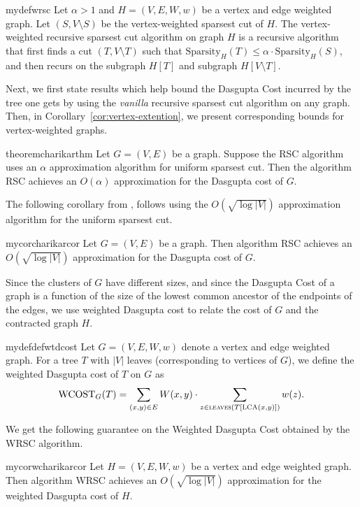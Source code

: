 \documentclass[letterpaper,11pt]{article}
\newcommand{\spp}{\text{Sparsity}}
\newcommand{\lca}{\textsc{LCA}}
\newcommand{\wCT}{\text{WCOST}}
\newcommand{\lv}{\textsc{leaves}}
\theoremstyle{plain}
\theoremstyle{definition}
\theoremstyle{remark}
\begin{document}
\begin{restatable}{mydef}{wrsc}
\label{def:wrc}
Let $\alpha>1$ and $H=(V,E,W,w)$ be a vertex and edge weighted graph. Let $(S, V\setminus S)$ be the vertex-weighted sparsest cut of $H$.  The vertex-weighted recursive sparsest cut algorithm on graph $H$ is a recursive algorithm that first finds a cut $(T,V\setminus T)$ such that $\spp_H(T) \leq \alpha\cdot \spp_H(S)$, and then recurs on the subgraph $H[T]$ and subgraph $H[V\setminus T]$.
\end{restatable}

Next, we first state results which help bound the Dasgupta Cost incurred by the tree one gets by using the \emph{vanilla} recursive sparsest cut algorithm on any graph. Then, in Corollary~\ref{cor:vertex-extention}, we present corresponding bounds for vertex-weighted graphs. 


\begin{restatable}{theorem}{charikarthm} \label{thm:charikar}
	Let $G=(V,E)$ be a graph. Suppose the RSC algorithm uses an $\alpha$ approximation
	algorithm for uniform sparsest cut. Then the algorithm RSC achieves an $O(\alpha)$
	approximation for the Dasgupta cost of $G$.
\end{restatable}

The following corollary from \cite{charikar2017approximate},  follows using the $O(\sqrt{\log |V|})$ approximation algorithm for the uniform sparsest cut.

\begin{restatable}{mycor}{charikarcor}\label{cor:charikar}
	Let $G=(V,E)$ be a graph. Then algorithm RSC achieves an $O(\sqrt{\log |V|})$ approximation
	for the Dasgupta cost of $G$.
\end{restatable}
Since the clusters of $G$ have different sizes, and since the Dasgupta Cost of a graph is a function of the size of the lowest common ancestor of the endpoints of the edges, 
we use weighted Dasgupta cost to relate the cost of $G$ and the contracted graph $H$. 

\begin{restatable}{mydef}{defwtdcost}
\label{def:weightedcost}
	Let $G=(V,E,W, w)$ denote a vertex and edge weighted graph. For a tree $T$ with $|V|$ leaves (corresponding to vertices
	of $G$), we define the weighted Dasgupta cost of $T$ on $G$ as 
	$$\wCT_G(T) = \sum_{(x,y) \in E} W(x,y) \cdot \sum_{z\in \lv(T[\lca(x,y)])} w(z).$$
	\label{def:wtd:dcost}
\end{restatable}
We get the following guarantee on the Weighted Dasgupta Cost obtained by the  \textsc{WRSC} algorithm. 
\begin{restatable}{mycor}{wcharikarcor}
\label{cor:vertex-extention}
Let $H=(V,E,W,w)$  be a vertex and edge weighted graph. Then algorithm \textsc{WRSC} achieves an $O(\sqrt{\log |V|})$ approximation for the weighted Dasgupta cost of $H$.
\end{restatable}
\end{document}
